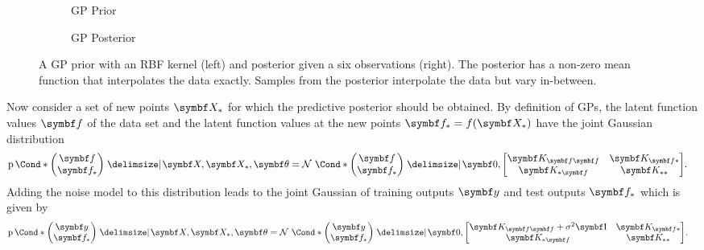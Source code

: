 \begin{figure}[t]
    \begin{subfigure}[b]{\halffigurewidth}
        \centering
        \caption{GP Prior}
        \label{fig:gp:gp_posterior:prior}
    \end{subfigure}
    \hfill
    \begin{subfigure}[b]{\halffigurewidth}
        \centering
        \caption{GP Posterior}
        \label{fig:gp:gp_posterior:posterior}
    \end{subfigure}
    \caption[GP posterior]{
        \label{fig:gp:gp_posterior}
        A GP prior with an RBF kernel (left) and posterior given a six observations (right).
        The posterior has a non-zero mean function that interpolates the data exactly.
        Samples from the posterior interpolate the data but vary in-between.
    }
\end{figure}
Now consider a set of new points $\mat{X}_\ast$ for which the predictive posterior should be obtained.
By definition of GPs, the latent function values $\mat{f}$ of the data set and the latent function values at the new points $\mat{f}_\ast = f(\mat{X}_\ast)$ have the joint Gaussian distribution
\begin{align}
    \Prob*{\begin{pmatrix}
            \mat{f} \\
            \mat{f}_\ast
        \end{pmatrix} \given \mat{X}, \mat{X}_\ast, \mat{\theta}} & = \Gaussian*{\begin{pmatrix}
            \mat{f} \\
            \mat{f}_\ast
        \end{pmatrix} \given \mat{0}, \begin{bmatrix}
            \mat{K}_{\mat{f}\mat{f}} & \mat{K}_{\mat{f}\ast} \\
            \mat{K}_{\ast\mat{f}}    & \mat{K}_{\ast\ast}
        \end{bmatrix}}.
\end{align}
Adding the noise model to this distribution leads to the joint Gaussian of training outputs $\mat{y}$ and test outputs $\mat{f}_\ast$ which is given by
\begin{align}
    \label{eq:gp:predictive_joint}
    \Prob*{\begin{pmatrix}
            \mat{y} \\
            \mat{f}_\ast
        \end{pmatrix} \given \mat{X}, \mat{X}_\ast, \mat{\theta}} & = \Gaussian*{\begin{pmatrix}
            \mat{y} \\
            \mat{f}_\ast
        \end{pmatrix} \given \mat{0}, \begin{bmatrix}
            \mat{K}_{\mat{f}\mat{f}} + \sigma^2 \Eye & \mat{K}_{\mat{f}\ast} \\
            \mat{K}_{\ast\mat{f}}                    & \mat{K}_{\ast\ast}
        \end{bmatrix}}.
\end{align}
